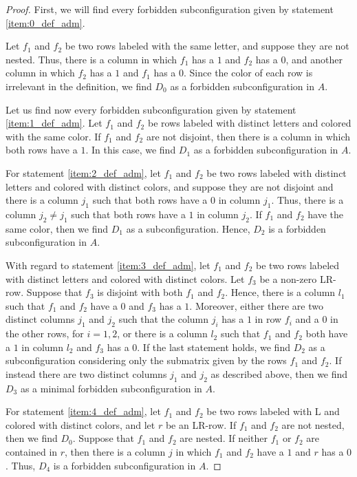 \documentclass[12pt]{book}
\theoremstyle{plain}
\theoremstyle{remark}
\begin{document}
\begin{proof}

\vspace{1mm}
First, we will find every forbidden subconfiguration given by statement \ref{item:0_def_adm}.

Let $f_1$ and $f_2$ be two rows labeled with the same letter, and suppose they are not nested. Thus, there is a column in which $f_1$ has a $1$ and $f_2$ has a $0$, and another column in which $f_2$ has a $1$ and $f_1$ has a $0$. Since the color of each row is irrelevant in the definition, we find $D_0$ as a forbidden subconfiguration in $A$.

Let us find now every forbidden subconfiguration given by statement \ref{item:1_def_adm}.
Let $f_1$ and $f_2$ be rows labeled with distinct letters and colored with the same color. If $f_1$ and $f_2$ are not disjoint, then there is a column in which both rows have a $1$. In this case, we find $D_1$ as a forbidden subconfiguration in $A$.

For statement \ref{item:2_def_adm}, let $f_1$ and $f_2$ be two rows labeled with distinct letters and colored with distinct colors, and suppose they are not disjoint and there is a column $j_1$ such that both rows have a $0$ in column $j_1$. Thus, there is a column $j_2 \neq j_1$ such that both rows have a $1$ in column $j_2$.
If $f_1$ and $f_2$ have the same color, then we find $D_1$ as a subconfiguration. Hence, $D_2$ is a forbidden subconfiguration in $A$.

With regard to statement \ref{item:3_def_adm}, let $f_1$ and $f_2$ be two rows labeled with distinct letters and colored with distinct colors. Let $f_3$ be a non-zero LR-row. Suppose that $f_3$ is disjoint with both $f_1$ and $f_2$. 
Hence, there is a column $l_1$ such that $f_1$ and $f_2$ have a $0$ and $f_3$ has a $1$. Moreover, either there are two distinct columns $j_1$ and $j_2$ such that the column $j_i$ has a $1$ in row $f_i$ and a $0$ in the other rows, for $i=1, 2$, or there is a column $l_2$ such that $f_1$ and $f_2$ both have a $1$ in column $l_2$ and $f_3$ has a $0$.
If the last statement holds, we find $D_2$ as a subconfiguration considering only the submatrix given by the rows $f_1$ and $f_2$.
If instead there are two distinct columns $j_1$ and $j_2$ as described above, then we find $D_3$ as a minimal forbidden subconfiguration in $A$.

For statement \ref{item:4_def_adm}, let $f_1$ and $f_2$ be two rows labeled with L and colored with distinct colors, and let $r$ be an LR-row. If $f_1$ and $f_2$ are not nested, then we find $D_0$. Suppose that $f_1$ and $f_2$ are nested. If neither $f_1$ or $f_2$ are contained in $r$, then there is a column $j$ in which $f_1$ and $f_2$ have a $1$ and $r$ has a $0$.
Thus, $D_4$ is a forbidden subconfiguration in $A$.


\end{proof}
\end{document}
